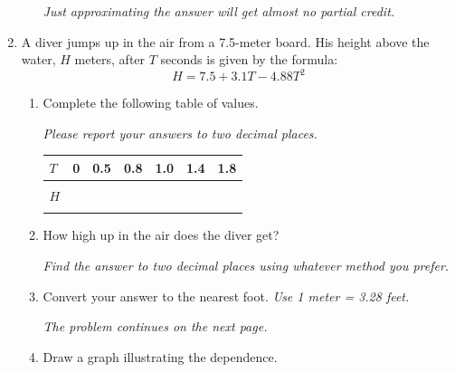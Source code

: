 \documentclass[12pt]{article}
\begin{document}
\begin{enumerate}
\begin{enumerate}
\emph{Just approximating the answer will get almost no partial credit.}

\vfill
\vfill
\vfill
\end{enumerate}

\newpage %

\item A diver jumps up in the air from a 7.5-meter board.  His height above the water, $H$ meters, after $T$ seconds is given by the formula: $$H = 7.5 + 3.1T - 4.88T^2$$

\begin{enumerate}
\item Complete the following table of values.

\emph{Please report your answers to two decimal places.}

\begin{center}
\begin{tabular} {|l|c|c|c|c|c|c|} \hline
$T$ & 0 & 0.5 & 0.8 & 1.0 & 1.4 & 1.8 \\ \hline
&&&&&& \\
$H$ & \hspace{.7in} & \hspace{.7in}  & \hspace{.7in}  & \hspace{.7in}  & \hspace{.7in}  & \hspace{.7in}  \\
&&&&&& \\ \hline
\end{tabular}
\end{center}

\item How high up in the air does the diver get?

\emph{Find the answer to two decimal places using whatever method you prefer.}
\vfill
\vfill

\item Convert your answer to the nearest foot.  \emph{Use 1 meter = 3.28 feet.}
\vfill

\hspace{-.5in} \emph{The problem continues on the next page.}

\newpage %

\item Draw a graph illustrating the dependence.


\end{enumerate}
\end{enumerate}
\end{document}
